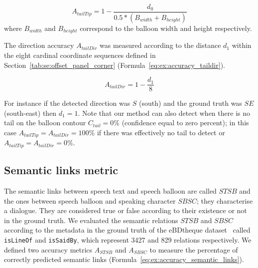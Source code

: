 \begin{equation}
\label{eq:ex:accuracy_tailtip}
  A_{tailTip} = 1 - \frac{d_0}{0.5 * (B_{width} + B_{height})}
\end{equation}
where $B_{width}$ and $B_{height}$ correspond to the balloon width and height respectively.

The direction accuracy $A_{tailDir}$ was measured according to the distance $d_1$ within the eight cardinal coordinate sequences defined in Section~\ref{tab:se:offset_panel_corner} (Formula~\ref{eq:ex:accuracy_taildir}).

\begin{equation}
\label{eq:ex:accuracy_taildir}
  A_{tailDir} = 1 - \frac{d_1}{8}
\end{equation}

For instance if the detected direction was $S$ (south) and the ground truth was $SE$ (south-east) then $d_1=1$.
Note that our method can also detect when there is no tail on the balloon contour $C_{tail}=0\%$ (confidence equal to zero percent); in this case $A_{tailTip}=A_{tailDir}=100\%$ if there was effectively no tail to detect or $A_{tailTip}=A_{tailDir}=0\%$.


\subsection{Semantic links metric} %
\label{sub:ex:semantic_links_metric}

The semantic links between speech text and speech balloon are called $STSB$ and the ones between speech balloon and speaking character $SBSC$; they characterise a dialogue.
They are considered true or false according to their existence or not in the ground truth.
We evaluated the semantic relations $STSB$ and $SBSC$ according to the metadata in the ground truth of the eBDtheque dataset~\cite{Guerin2013} called \texttt{{isLineOf}} and \texttt{{isSaidBy}}, which represent 3427 and 829 relations respectively.
We defined two accuracy metrics $A_{STSB}$ and $A_{SBSC}$ to measure the percentage of correctly predicted semantic links (Formula~\ref{eq:ex:accuracy_semantic_links}).

